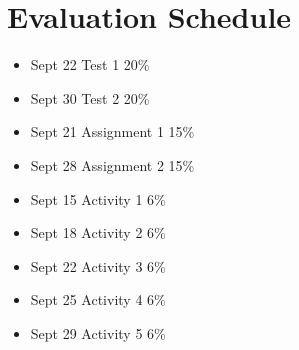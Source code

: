 \section * {Evaluation Schedule}

\begin{itemize}
    \item     Sept 22 Test  1  20\% 
    \item     Sept 30 Test  2 20\% 
    \item     Sept 21 Assignment 1  15\%
    \item     Sept 28 Assignment 2 15\%   
    \item     Sept 15 Activity 1  6\%
    \item     Sept 18 Activity 2  6\%    
    \item     Sept 22 Activity 3  6\%
    \item     Sept 25 Activity 4  6\%     
    \item     Sept 29 Activity 5  6\%
    
\end{itemize}